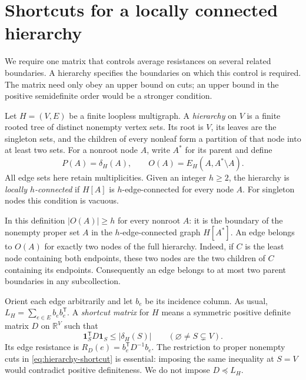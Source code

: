 \section{Shortcuts for a locally connected hierarchy}\label{sec:hierarchy}

We require one matrix that controls average resistances on several related
boundaries.  A hierarchy specifies the boundaries on which this control is
required.  The matrix need only obey an upper bound on cuts; an upper bound
in the positive semidefinite order would be a stronger condition.

\begin{definition}\label{def:hierarchy}
Let $H=(V,E)$ be a finite loopless multigraph.  A \emph{hierarchy} on $V$
is a finite rooted tree of distinct nonempty vertex sets.  Its root is $V$,
its leaves are the singleton sets, and the children of every nonleaf form
a partition of that node into at least two sets.  For a nonroot node $A$,
write $A^*$ for its parent and define
\[
 P(A)=\delta_H(A),\qquad
 O(A)=E_H(A,A^*\setminus A).
\]
All edge sets here retain multiplicities.  Given an integer $h\ge2$, the
hierarchy is \emph{locally $h$-connected} if $H[A]$ is $h$-edge-connected
for every node $A$.  For singleton nodes this condition is vacuous.
\end{definition}

In this definition $|O(A)|\ge h$ for every nonroot $A$: it is the boundary
of the nonempty proper set $A$ in the $h$-edge-connected graph $H[A^*]$.
An edge belongs to $O(A)$ for exactly two nodes of the full hierarchy.
Indeed, if $C$ is the least node containing both endpoints, these two
nodes are the two children of $C$ containing its endpoints.  Consequently
an edge belongs to at most two parent boundaries in any subcollection.

Orient each edge arbitrarily and let $b_e$ be its incidence column.  As
usual, $L_H=\sum_{e\in E}b_eb_e^{\mathsf T}$.  A \emph{shortcut matrix}
for $H$ means a symmetric positive definite matrix $D$ on $\mathbb R^V$
such that
\begin{equation}\label{eq:hierarchy-shortcut}
 \mathbf 1_S^{\mathsf T}D\mathbf 1_S\le |\delta_H(S)|
 \qquad(\varnothing\ne S\subsetneq V).
\end{equation}
Its edge resistance is $R_D(e)=b_e^{\mathsf T}D^{-1}b_e$.
The restriction to proper nonempty cuts in
\eqref{eq:hierarchy-shortcut} is essential: imposing the same inequality
at $S=V$ would contradict positive definiteness.  We do not impose
$D\preceq L_H$.

